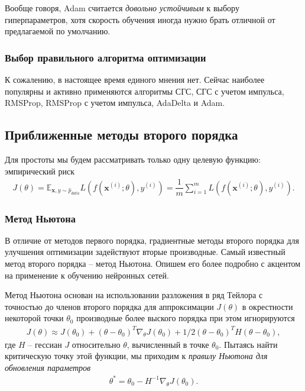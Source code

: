 \documentclass[%
	11pt,
	a4paper,
	utf8,
]{article}
\begin{document}
Вообще говоря, Adam считается \emph{довольно устойчивым} к выбору гиперпараметров, хотя скорость обучения иногда нужно брать отличной от предлагаемой по умолчанию.

\subsubsection{Выбор правильного алгоритма оптимизации}

К сожалению, в настоящее время единого мнения нет. Сейчас наиболее популярны и активно применяются алгоритмы СГС, СГС с учетом импульса, RMSProp, RMSProp с учетом импульса, AdaDelta и Adam.

\subsection{Приближенные методы второго порядка}

Для простоты мы будем рассматривать только одну целевую функцию: эмпирический риск
\begin{align*}
	J(\theta) = \mathbb{E}_{ \mathbf{x}, y \sim \hat{p}_{data} } L (f(\mathbf{x}^{(i)}; {\theta}), y^{(i)}) = \dfrac{1}{m} \sum_{i=1}^{m} L (f(\mathbf{x}^{(i)}; \theta), y^{(i)}).
\end{align*}

\subsubsection{Метод Ньютона}

В отличие от методов первого порядка, градиентные методы второго порядка для улучшения оптимизации задействуют вторые производные. Самый известный метод второго порядка -- метод Ньютона. Опишем его более подробно с акцентом на применение к обучению нейронных сетей.

Метод Ньютона основан на использовании разложения в ряд Тейлора с точностью до членов второго порядка для аппроксимации $ J(\theta) $ в окрестности некоторой точки $ \theta_0 $ производные более выского порядка при этом игнорируются
\begin{align*}
	J(\theta) \approx J(\theta_0) + (\theta - \theta_0)^T \nabla_{\theta} J(\theta_0) +1/2 (\theta - \theta_0)^T H (\theta - \theta_0),
\end{align*}
где $ H $ -- гессиан $ J $ относительно $ \theta $, вычисленный в точке $ \theta_0 $.  Пытаясь найти критическую точку этой функции, мы приходим к \emph{правилу Ньютона для обновления параметров}
\begin{align}\label{eq:newton}
	\theta^{*} = \theta_0 - H^{-1} \nabla_{\theta} J(\theta_0).
\end{align}
\end{document}
